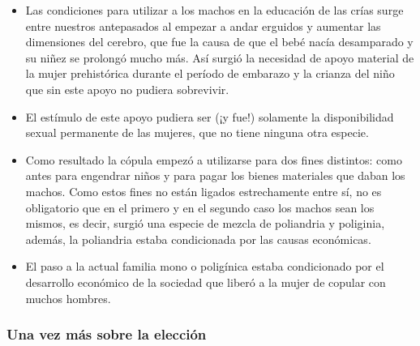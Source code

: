 \begin{itemize}
\tightlist
\item
  Las condiciones para utilizar a los machos en la educación de las
  crías surge entre nuestros antepasados al empezar a andar erguidos y
  aumentar las dimensiones del cerebro, que fue la causa de que el bebé
  nacía desamparado y su niñez se prolongó mucho más. Así surgió la
  necesidad de apoyo material de la mujer prehistórica durante el
  período de embarazo y la crianza del niño que sin este apoyo no
  pudiera sobrevivir.
\item
  El estímulo de este apoyo pudiera ser (¡y fue!) solamente la
  disponibilidad sexual permanente de las mujeres, que no tiene ninguna
  otra especie.
\item
  Como resultado la cópula empezó a utilizarse para dos fines distintos:
  como antes para engendrar niños y para pagar los bienes materiales que
  daban los machos. Como estos fines no están ligados estrechamente
  entre sí, no es obligatorio que en el primero y en el segundo caso los
  machos sean los mismos, es decir, surgió una especie de mezcla de
  poliandria y poliginia, además, la poliandria estaba condicionada por
  las causas económicas.
\item
  El paso a la actual familia mono o poligínica estaba condicionado por
  el desarrollo económico de la sociedad que liberó a la mujer de
  copular con muchos hombres.
\end{itemize}

\protect\hypertarget{M16}{}{}

\subsubsection{Una vez más sobre la
elección}\label{una-vez-muxe1s-sobre-la-elecciuxf3n}


